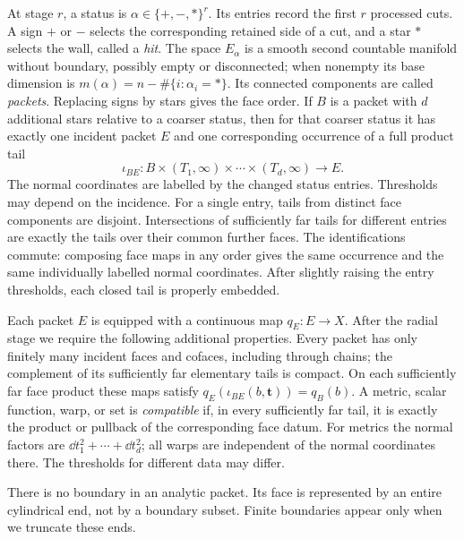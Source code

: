 \begin{definition}\label{packet:category}
At stage $r$, a status is $\alpha\in\{+,-,*\}^{r}$.
Its entries record the first $r$ processed cuts.
A sign $+$ or $-$ selects the corresponding retained side of a cut,
and a star $*$ selects the wall, called a \emph{hit}.
The space $E_\alpha$ is a smooth second countable manifold without boundary,
possibly empty or disconnected; when nonempty its base dimension is
$m(\alpha)=n-\#\{i:\alpha_i=*\}$.  Its connected components are called
\emph{packets}.  Replacing signs by stars gives the face order.
If $B$ is a packet with $d$ additional stars relative to a coarser status,
then for that coarser status it has exactly one incident packet $E$ and
one corresponding occurrence of a full product tail
\begin{equation}\label{packet:tail}
 \iota_{BE}:B\times(T_1,\infty)\times\cdots\times(T_d,\infty)
       \longrightarrow E.
\end{equation}
The normal coordinates are labelled by the changed status entries.
Thresholds may depend on the incidence.  For a single entry, tails
from distinct face components are disjoint.  Intersections of sufficiently
far tails for different entries are exactly the tails over their common
further faces.  The identifications commute: composing face maps in
any order gives the same occurrence and the same individually labelled
normal coordinates.  After slightly raising the entry thresholds,
each closed tail is properly embedded.

Each packet $E$ is equipped with a continuous map $q_E:E\to X$.
After the radial stage we require the following additional properties.
Every packet has only finitely many incident faces and cofaces, including
through chains; the complement of its sufficiently far elementary tails
is compact.  On each sufficiently far face product these maps satisfy
$q_E(\iota_{BE}(b,\mathbf t))=q_B(b)$.
A metric, scalar function, warp, or set is \emph{compatible} if, in every
sufficiently far tail, it is exactly the product or pullback of the
corresponding face datum.  For metrics the normal factors are
$\dd t_1^2+\cdots+\dd t_d^2$; all warps are independent of the normal
coordinates there.  The thresholds for different data may differ.
\end{definition}

There is no boundary in an analytic packet.  Its face is represented by
an entire cylindrical end, not by a boundary subset.  Finite boundaries
appear only when we truncate these ends.

